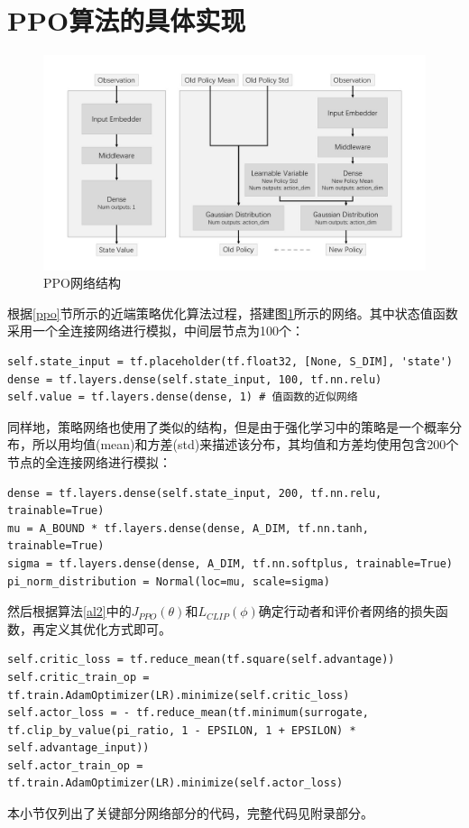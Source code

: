 \documentclass[bachelor]{thesis-uestc}
\begin{document}
	\section{PPO算法的具体实现}\label{sec:ppo-code}
	\begin{figure}[h]
		\centering
		\includegraphics[width=14cm]{./pic/ppo.jpg}
		\caption{PPO网络结构}
		\label{ppofig}
	\end{figure}
	根据\ref{ppo}节所示的近端策略优化算法过程，搭建图\ref{ppofig}所示的网络。其中状态值函数采用一个全连接网络进行模拟，中间层节点为100个：
	\begin{lstlisting}
self.state_input = tf.placeholder(tf.float32, [None, S_DIM], 'state')
dense = tf.layers.dense(self.state_input, 100, tf.nn.relu)
self.value = tf.layers.dense(dense, 1) # 值函数的近似网络
	\end{lstlisting}
	同样地，策略网络也使用了类似的结构，但是由于强化学习中的策略是一个概率分布，所以用均值(mean)和方差(std)来描述该分布，其均值和方差均使用包含200个节点的全连接网络进行模拟：
	\begin{lstlisting}
dense = tf.layers.dense(self.state_input, 200, tf.nn.relu, trainable=True)
mu = A_BOUND * tf.layers.dense(dense, A_DIM, tf.nn.tanh, trainable=True)
sigma = tf.layers.dense(dense, A_DIM, tf.nn.softplus, trainable=True)
pi_norm_distribution = Normal(loc=mu, scale=sigma)
	\end{lstlisting}
	然后根据算法\ref{al2}中的$J_{PPO}(\theta)$和$L_{CLIP}(\phi)$确定行动者和评价者网络的损失函数，再定义其优化方式即可。
	\begin{lstlisting}
self.critic_loss = tf.reduce_mean(tf.square(self.advantage))
self.critic_train_op = tf.train.AdamOptimizer(LR).minimize(self.critic_loss)
self.actor_loss = - tf.reduce_mean(tf.minimum(surrogate, tf.clip_by_value(pi_ratio, 1 - EPSILON, 1 + EPSILON) * self.advantage_input))
self.actor_train_op = tf.train.AdamOptimizer(LR).minimize(self.actor_loss)
	\end{lstlisting}
	本小节仅列出了关键部分网络部分的代码，完整代码见附录部分。
	
\end{document}
